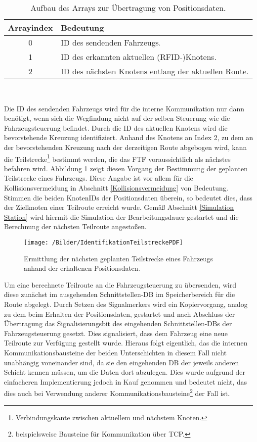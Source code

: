 		\begin{table}[h]
			\begin{tabular}{| c | l |}
				\hline
				\textbf{Arrayindex} & \textbf{Bedeutung} \\ \hline \hline
				0 & ID des sendenden Fahrzeugs. \\ \hline
				1 & ID des erkannten aktuellen (\ac{RFID}-)Knotens. \\ \hline
				2 & ID des nächsten Knotens entlang der aktuellen Route. \\
				\hline
			\end{tabular}\\
			\caption{Aufbau des Arrays zur Übertragung von Positionsdaten.}
		\end{table}
		Die ID des sendenden Fahrzeugs wird für die interne Kommunikation nur dann benötigt, wenn sich die Wegfindung nicht auf der selben Steuerung wie die Fahrzeugsteuerung befindet. Durch die ID des aktuellen Knotens wird die bevorstehende Kreuzung identifiziert. Anhand des Knotens an Index 2, zu dem an der bevorstehenden Kreuzung nach der derzeitigen Route abgebogen wird, kann die Teilstrecke\footnote{Verbindungskante zwischen aktuellem und nächstem Knoten.} bestimmt werden, die das \ac{FTF} voraussichtlich als nächstes befahren wird. Abbildung \ref{Identifikation Teilstrecke} zeigt diesen Vorgang der Bestimmung der geplanten Teilstrecke eines Fahrzeugs. Diese Angabe ist vor allem für die Kollisionsvermeidung in Abschnitt \ref{Kollisionsvermeidung} von Bedeutung. Stimmen die beiden KnotenIDs der Positionsdaten überein, so bedeutet dies, dass der Zielknoten einer Teilroute erreicht wurde. Gemäß Abschnitt \ref{Simulation Station} wird hiermit die Simulation der Bearbeitungsdauer gestartet und die Berechnung der nächsten Teilroute angestoßen.
		
		\begin{figure}[h]
			\centering
			\texttt{[image: /Bilder/IdentifikationTeilstreckePDF]}
			\vspace{0.2cm}
			\caption{Ermittlung der nächsten geplanten Teilstrecke eines Fahrzeugs anhand der erhaltenen Positionsdaten.}\label{Identifikation Teilstrecke}
		\end{figure}
		
		Um eine berechnete Teilroute an die Fahrzeugsteuerung zu übersenden, wird diese zunächst im ausgehenden Schnittstellen-\ac{DB} im Speicherbereich für die Route abgelegt. Durch Setzen des Signalmerkers wird ein Kopiervorgang, analog zu dem beim Erhalten der Positionsdaten, gestartet und nach Abschluss der Übertragung das Signalisierungsbit des eingehenden Schnittstellen-{DB}s der Fahrzeugsteuerung gesetzt. Dies signalisiert, dass dem Fahrzeug eine neue Teilroute zur Verfügung gestellt wurde. Hieraus folgt eigentlich, das die internen Kommunikationsbausteine der beiden Unterschichten in diesem Fall nicht unabhängig voneinander sind, da sie den eingehenden \ac{DB} der jeweils anderen Schicht kennen müssen, um die Daten dort abzulegen. Dies wurde aufgrund der einfacheren Implementierung jedoch in Kauf genommen und bedeutet nicht, das dies auch bei Verwendung anderer Kommunikationsbausteine\footnote{beispielsweise Bausteine für Kommunikation über \ac{TCP}.} der Fall ist.
				
